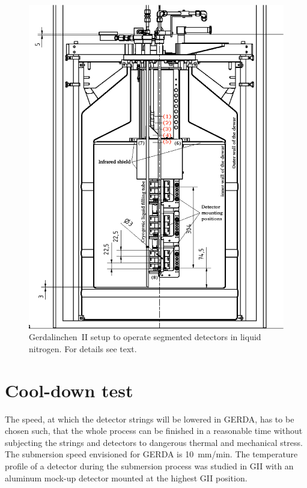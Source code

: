 \begin{figure}[hbtp]
\centering
\includegraphics[width=\textwidth]{GIIscheme}
\caption{Gerdalinchen~II setup to operate segmented detectors in liquid nitrogen. For details see text.}
\label{fig:ii:sch}
\end{figure}

\section{Cool-down test}
\label{sec:ii:cool}
The speed, at which the detector strings will be lowered in GERDA, has to be chosen such, that the whole process can be finished in a reasonable time without subjecting the strings and detectors to dangerous thermal and mechanical stress. The submersion speed envisioned for GERDA is 10~mm/min. The temperature profile of a detector during the submersion process was studied in GII with an aluminum mock-up detector mounted at the highest GII position. 

